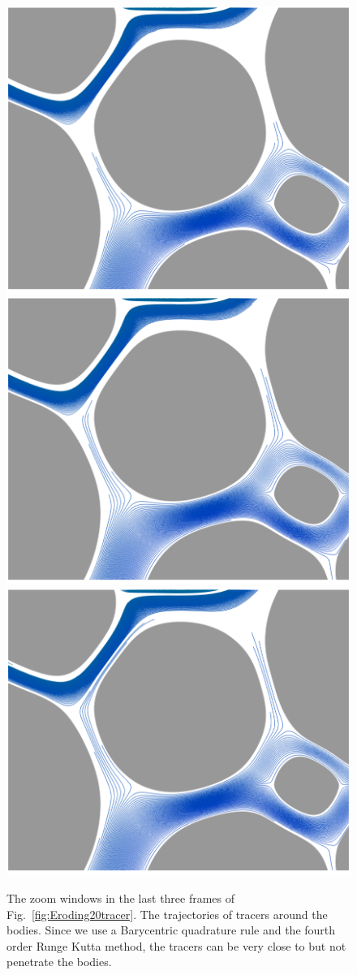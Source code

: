\documentclass[preprint, 10pt]{elsarticle}
\begin{document}
\begin{figure}[H]
\begin{center}
\includegraphics[width = 0.3 \textwidth]{./figs/tracer_20b210_zoom}
\includegraphics[width = 0.3 \textwidth]{./figs/tracer_20b240_zoom}
\includegraphics[width = 0.3 \textwidth]{./figs/tracer_20b270_zoom}
\caption{\label{fig:Eroding20zoom}The zoom windows in the last three frames of Fig.~\ref{fig:Eroding20tracer}. The trajectories of tracers around the bodies. Since we use a Barycentric quadrature rule and the fourth order Runge Kutta method, the tracers can be very close to but not penetrate the bodies. }
\end{center}
\end{figure}
\end{document}
